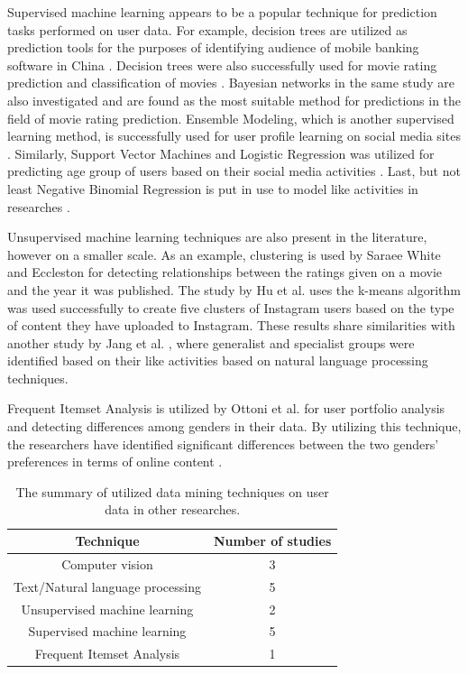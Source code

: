   Supervised machine learning appears to be a popular technique for prediction tasks performed on user data. For example, decision trees are utilized as prediction tools for the purposes of identifying audience of mobile banking software in China \cite{chinesemobilebankingusers}. Decision trees were also successfully used for movie rating prediction \cite{saraee2004data} and classification of movies \cite{kabinsingha2012movie}. Bayesian networks in the same study \cite{kabinsingha2012movie} are also investigated and are found as the most suitable method for predictions in the field of movie rating prediction. Ensemble Modeling, which is another supervised learning method, is successfully used for user profile learning on social media sites \cite{farseev2015harvestingmultiplesources}. Similarly, Support Vector Machines and Logistic Regression was utilized for predicting age group of users based on their social media activities \cite{han2016teensarefrommars}. Last, but not least Negative Binomial Regression is put in use to model like activities in researches \cite{jang2015no, bakhshi2014faces}.

  Unsupervised machine learning techniques are also present in the literature, however on a smaller scale. As an example, clustering is used by Saraee White and Eccleston \cite{saraee2004data} for detecting relationships between the ratings given on a movie and the year it was published. The study by Hu et al. \cite{hu2014we} uses the k-means algorithm was used successfully to create five clusters of Instagram users based on the type of content they have uploaded to Instagram. These results share similarities with another study by Jang et al. \cite{jang2015no}, where generalist and specialist groups were identified based on their like activities based on natural language processing techniques. 

  Frequent Itemset Analysis is utilized by Ottoni et al. \cite{ottoni2013ladies} for user portfolio analysis and detecting differences among genders in their data. By utilizing this technique, the researchers have identified significant differences between the two genders' preferences in terms of online content \cite{ottoni2013ladies}. 

  \begin{table}[!t]
    \renewcommand{\arraystretch}{1.5}
    \caption{The summary of utilized data mining techniques on user data in other researches.}
    \label{table_of_techniques}
    \centering
      \begin{tabular}{c||c}
        Technique & Number of studies \\ 
        \hline
        Computer vision & 3  \\
        Text/Natural language processing & 5 \\
        Unsupervised machine learning & 2 \\
        Supervised machine learning & 5 \\
        Frequent Itemset Analysis & 1
      \end{tabular}
  \end{table}

